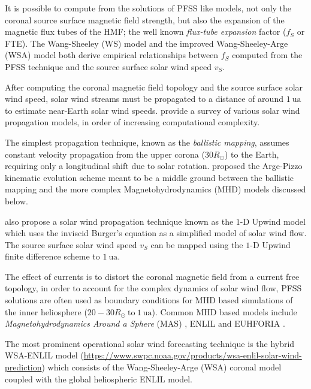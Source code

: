 It is possible to compute from the solutions of PFSS like models, not only the coronal source surface magnetic field strength, 
but also the expansion of the magnetic flux tubes of the HMF; the well known \emph{flux-tube expansion} factor ($f_S$ or FTE). 
The Wang-Sheeley (WS) model \citep{WSAModel} and the improved Wang-Sheeley-Arge (WSA) model \citep{arge2000improvement,arge2004stream} 
both derive empirical relationships between $f_S$ computed from the PFSS technique and the source surface solar wind speed $v_S$.  

After computing the coronal magnetic field topology and the source surface solar wind speed, solar wind streams must be propagated 
to a distance of around $\SI{1}{\astronomicalunit}$ to estimate near-Earth solar wind speeds. \citet{Riley2011} provide a survey of 
various solar wind propagation models, in order of increasing computational complexity. 

The simplest propagation technique, known as the \emph{ballistic mapping}, assumes constant velocity propagation from the upper 
corona ($30R_{\odot}$) to the Earth, requiring only a longitudinal shift due to solar rotation. \citet{arge2000improvement} 
proposed the Arge-Pizzo kinematic evolution scheme meant to be a middle ground between the ballistic mapping and the more 
complex Magnetohydrodynamics (MHD) models discussed below.

\citet{Riley2011} also propose a solar wind propagation technique known as the $1\textrm{-}\text{D}$ Upwind model 
which uses the inviscid Burger's equation as a simplified model of solar wind flow. The source surface solar wind 
speed $v_S$ can be mapped using the $1\textrm{-}\text{D}$ Upwind finite difference scheme to $\SI{1}{\astronomicalunit}$.

The effect of currents is to distort the coronal magnetic field from a current free topology, in order to account for 
the complex dynamics of solar wind flow, PFSS solutions are often used as boundary conditions for MHD based simulations 
of the inner heliosphere ($20-30 R_{\odot} \ \mathrm{to} \ \SI{1}{\astronomicalunit}$). Common MHD based models include 
\emph{Magnetohydrodynamics Around a Sphere} (MAS) \citep{linker1999magnetohydrodynamic}, ENLIL 
\citep{ODSTRCIL1996,ODSTRCIL1999a,ODSTRCIL1999b,ODSTRCIL2003,ODSTRCIL2004} and EUHFORIA \citep{pomoell2018euhforia}. 

The most prominent operational solar wind forecasting technique is the hybrid WSA-ENLIL model 
(\url{https://www.swpc.noaa.gov/products/wsa-enlil-solar-wind-prediction}) which consists of the Wang-Sheeley-Arge (WSA) 
coronal model coupled with the global heliospheric ENLIL model. 

